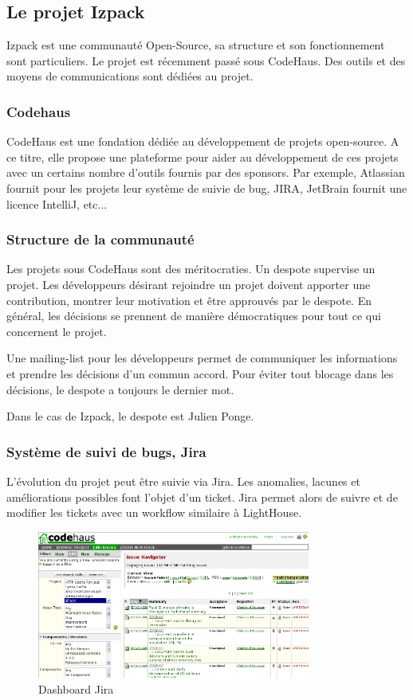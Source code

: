 \subsection{Le projet Izpack}
Izpack est une communauté Open-Source, sa structure et son fonctionnement sont particuliers. 
Le projet est récemment passé sous CodeHaus. 
Des outils et des moyens de communications sont dédiées au projet.
\subsubsection{Codehaus}
CodeHaus est une fondation dédiée au développement de projets open-source.
A ce titre, elle propose une plateforme pour aider au développement de ces projets avec un certains nombre d'outils fournis par des sponsors.
Par exemple, Atlassian fournit pour les projets leur système de suivie de bug, JIRA, JetBrain fournit une licence IntelliJ, etc...
\subsubsection{Structure de la communauté}
Les projets sous CodeHaus sont des méritocraties. 
Un despote supervise un projet.
Les développeurs désirant rejoindre un projet doivent apporter une contribution, montrer leur motivation et être approuvés par le despote.
En général, les décisions se prennent de manière démocratiques pour tout ce qui concernent le projet.

Une mailing-list pour les développeurs permet de communiquer les informations et prendre les décisions d'un commun accord.
Pour éviter tout blocage dans les décisions, le despote a toujours le dernier mot.

Dans le cas de Izpack, le despote est Julien Ponge.
\subsubsection{Système de suivi de bugs, Jira}
L'évolution du projet peut être suivie via Jira.
Les anomalies, lacunes et améliorations possibles font l'objet d'un ticket.
Jira permet alors de suivre et de modifier les tickets avec un workflow similaire à LightHouse.
\begin{figure}[H]
	\centering
	\includegraphics[width=0.8\textwidth]{../image/jira.png}
	\caption{Dashboard Jira}
\end{figure}
